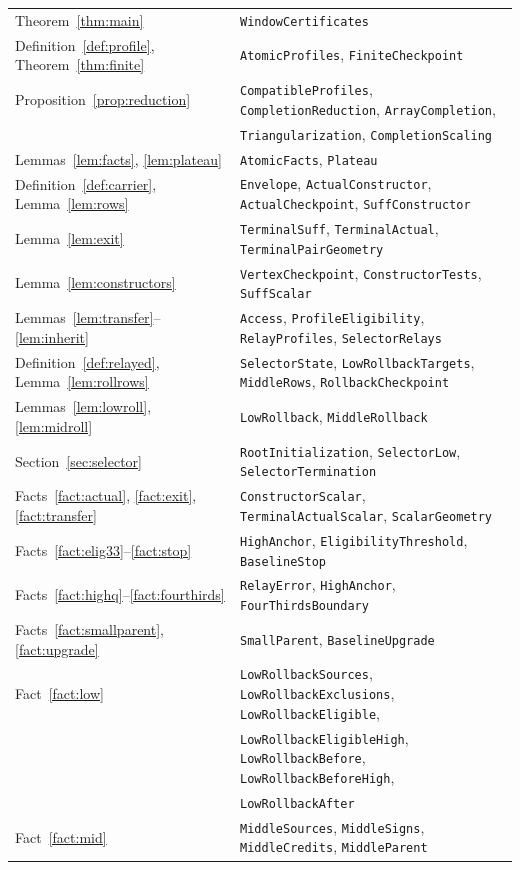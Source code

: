 \documentclass[11pt,a4paper]{article}
\numberwithin{equation}{section}
\theoremstyle{definition}
\begin{document}
\begin{center}\footnotesize
\begin{tabular}{@{}ll@{}}
\hline
Theorem~\ref{thm:main} & \texttt{WindowCertificates}\\
Definition~\ref{def:profile}, Theorem~\ref{thm:finite} & \texttt{AtomicProfiles}, \texttt{FiniteCheckpoint}\\
Proposition~\ref{prop:reduction} & \texttt{CompatibleProfiles}, \texttt{CompletionReduction}, \texttt{ArrayCompletion},\\
 & \texttt{Triangularization}, \texttt{CompletionScaling}\\
Lemmas~\ref{lem:facts}, \ref{lem:plateau} & \texttt{AtomicFacts}, \texttt{Plateau}\\
Definition~\ref{def:carrier}, Lemma~\ref{lem:rows} & \texttt{Envelope}, \texttt{ActualConstructor}, \texttt{ActualCheckpoint}, \texttt{SuffConstructor}\\
Lemma~\ref{lem:exit} & \texttt{TerminalSuff}, \texttt{TerminalActual}, \texttt{TerminalPairGeometry}\\
Lemma~\ref{lem:constructors} & \texttt{VertexCheckpoint}, \texttt{ConstructorTests}, \texttt{SuffScalar}\\
Lemmas~\ref{lem:transfer}--\ref{lem:inherit} & \texttt{Access}, \texttt{ProfileEligibility}, \texttt{RelayProfiles}, \texttt{SelectorRelays}\\
Definition~\ref{def:relayed}, Lemma~\ref{lem:rollrows} & \texttt{SelectorState}, \texttt{LowRollbackTargets}, \texttt{MiddleRows}, \texttt{RollbackCheckpoint}\\
Lemmas~\ref{lem:lowroll}, \ref{lem:midroll} & \texttt{LowRollback}, \texttt{MiddleRollback}\\
Section~\ref{sec:selector} & \texttt{RootInitialization}, \texttt{SelectorLow}, \texttt{SelectorTermination}\\
\hline
Facts~\ref{fact:actual}, \ref{fact:exit}, \ref{fact:transfer} & \texttt{ConstructorScalar}, \texttt{TerminalActualScalar}, \texttt{ScalarGeometry}\\
Facts~\ref{fact:elig33}--\ref{fact:stop} & \texttt{HighAnchor}, \texttt{EligibilityThreshold}, \texttt{BaselineStop}\\
Facts~\ref{fact:highq}--\ref{fact:fourthirds} & \texttt{RelayError}, \texttt{HighAnchor}, \texttt{FourThirdsBoundary}\\
Facts~\ref{fact:smallparent}, \ref{fact:upgrade} & \texttt{SmallParent}, \texttt{BaselineUpgrade}\\
Fact~\ref{fact:low} & \texttt{LowRollbackSources}, \texttt{LowRollbackExclusions}, \texttt{LowRollbackEligible},\\
 & \texttt{LowRollbackEligibleHigh}, \texttt{LowRollbackBefore}, \texttt{LowRollbackBeforeHigh},\\
 & \texttt{LowRollbackAfter}\\
Fact~\ref{fact:mid} & \texttt{MiddleSources}, \texttt{MiddleSigns}, \texttt{MiddleCredits}, \texttt{MiddleParent}\\
\hline
\end{tabular}
\end{center}
\end{document}
